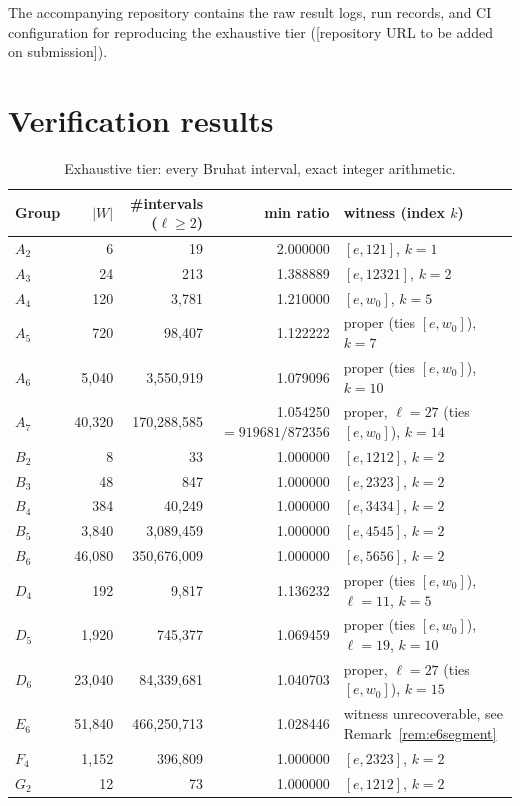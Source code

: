 \documentclass[11pt]{amsart}
\theoremstyle{plain}
\theoremstyle{definition}
\theoremstyle{remark}
\begin{document}
The accompanying repository contains the raw result logs, run records, and
CI configuration for reproducing the exhaustive tier
([repository URL to be added on submission]).

\section{Verification results}
\label{sec:results}

\begin{table}[htbp]
\centering
\caption{Exhaustive tier: every Bruhat interval, exact integer arithmetic.}
\label{tab:exhaustive}
\small
\begin{tabular}{@{}lrrrl@{}}
\toprule
Group & $|W|$ & \#intervals ($\ell\ge2$) & min ratio & witness (index $k$) \\
\midrule
$A_2$ & 6 & 19 & 2.000000 & $[e,121]$, $k=1$ \\
$A_3$ & 24 & 213 & 1.388889 & $[e,12321]$, $k=2$ \\
$A_4$ & 120 & 3{,}781 & 1.210000 & $[e,w_0]$, $k=5$ \\
$A_5$ & 720 & 98{,}407 & 1.122222 & proper (ties $[e,w_0]$), $k=7$ \\
$A_6$ & 5{,}040 & 3{,}550{,}919 & 1.079096 & proper (ties $[e,w_0]$), $k=10$ \\
$A_7$ & 40{,}320 & 170{,}288{,}585 & 1.054250 $=919681/872356$ & proper, $\ell=27$ (ties $[e,w_0]$), $k=14$ \\
$B_2$ & 8 & 33 & 1.000000 & $[e,1212]$, $k=2$ \\
$B_3$ & 48 & 847 & 1.000000 & $[e,2323]$, $k=2$ \\
$B_4$ & 384 & 40{,}249 & 1.000000 & $[e,3434]$, $k=2$ \\
$B_5$ & 3{,}840 & 3{,}089{,}459 & 1.000000 & $[e,4545]$, $k=2$ \\
$B_6$ & 46{,}080 & 350{,}676{,}009 & 1.000000 & $[e,5656]$, $k=2$ \\
$D_4$ & 192 & 9{,}817 & 1.136232 & proper (ties $[e,w_0]$), $\ell=11$, $k=5$ \\
$D_5$ & 1{,}920 & 745{,}377 & 1.069459 & proper (ties $[e,w_0]$), $\ell=19$, $k=10$ \\
$D_6$ & 23{,}040 & 84{,}339{,}681 & 1.040703 & proper, $\ell=27$ (ties $[e,w_0]$), $k=15$ \\
$E_6$ & 51{,}840 & 466{,}250{,}713 & 1.028446 & witness unrecoverable, see Remark~\ref{rem:e6segment} \\
$F_4$ & 1{,}152 & 396{,}809 & 1.000000 & $[e,2323]$, $k=2$ \\
$G_2$ & 12 & 73 & 1.000000 & $[e,1212]$, $k=2$ \\
\bottomrule
\end{tabular}
\end{table}
\end{document}
